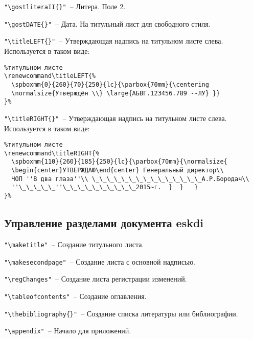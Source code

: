 \noindent \verb|"\gostliteraII{}"|~– Литера. Поле 2.

\noindent \verb|"\gostDATE{}"|~– Дата. На титульный лист для свободного стиля.

\noindent \verb|"\titleLEFT{}"|~– Утверждающая надпись на титульном листе слева. Используется в таком виде:
\begin{Verbatim}[frame=single]
% Раскомментировать если необходима утверждающая надпись на 
%титульном листе
\renewcommand\titleLEFT{%
  \spboxmm{0}{260}{70}{250}{lc}{\parbox{70mm}{\centering
  \normalsize{Утверждён \\} \large{АБВГ.123456.789 --ЛУ} }}
}%
\end{Verbatim}

\noindent \verb|"\titleRIGHT{}"|~– Утверждающая надпись на титульном листе слева. Используется в таком виде:
\begin{Verbatim}[frame=single]
% Раскомментировать если необходима утверждающая надпись на
%титульном листе
\renewcommand\titleRIGHT{%
  \spboxmm{110}{260}{185}{250}{lc}{\parbox{70mm}{\normalsize{
  \begin{center}УТВЕРЖДАЮ\end{center} Генеральный директор\\ 
  ЧОП ''В два глаза''\\ \_\_\_\_\_\_\_\_\_\_\_\_\_\_\_А.Р.Бородач\\
  ''\_\_\_\_\_''\_\_\_\_\_\_\_\_\_\_2015~г.  }  }   }
}%
\end{Verbatim}




\subsection{Управление разделами документа eskdi}


\noindent \verb|"\maketitle"|~– Создание титульного листа.

\noindent \verb|"\makesecondpage"|~– Создание листа с основной надписью.

\noindent \verb|"\regChanges"|~– Создание листа регистрации изменений.

\noindent \verb|"\tableofcontents"|~– Создание оглавления.

\noindent \verb|"\thebibliography{}"|~– Создание списка литературы или библиографии.

\noindent \verb|"\appendix"|~– Начало для приложений.

